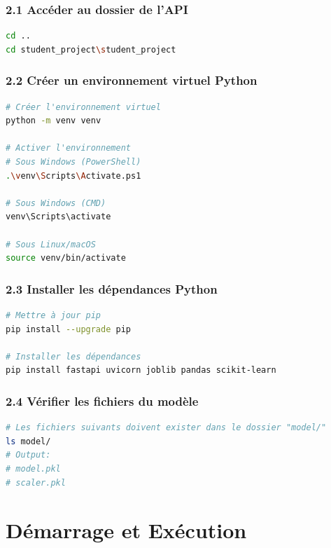 \documentclass[12pt,a4paper]{article}
\begin{document}
\subsubsection{2.1 Accéder au dossier de l'API}

\begin{lstlisting}[language=bash]
cd ..
cd student_project\student_project
\end{lstlisting}

\subsubsection{2.2 Créer un environnement virtuel Python}

\begin{lstlisting}[language=bash]
# Créer l'environnement virtuel
python -m venv venv

# Activer l'environnement
# Sous Windows (PowerShell)
.\venv\Scripts\Activate.ps1

# Sous Windows (CMD)
venv\Scripts\activate

# Sous Linux/macOS
source venv/bin/activate
\end{lstlisting}

\subsubsection{2.3 Installer les dépendances Python}

\begin{lstlisting}[language=bash]
# Mettre à jour pip
pip install --upgrade pip

# Installer les dépendances
pip install fastapi uvicorn joblib pandas scikit-learn
\end{lstlisting}

\subsubsection{2.4 Vérifier les fichiers du modèle}

\begin{lstlisting}[language=bash]
# Les fichiers suivants doivent exister dans le dossier "model/"
ls model/
# Output:
# model.pkl
# scaler.pkl
\end{lstlisting}

\newpage

\section{Démarrage et Exécution}
\end{document}
